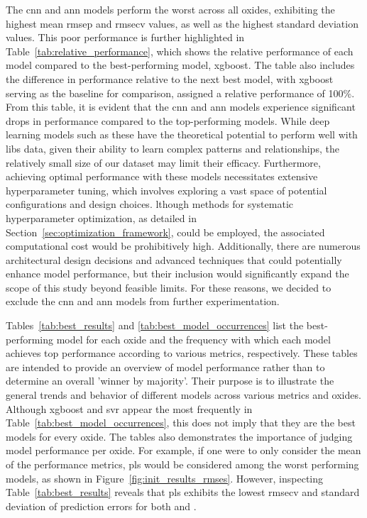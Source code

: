 The \gls{cnn} and \gls{ann} models perform the worst across all oxides, exhibiting the highest mean \gls{rmsep} and \gls{rmsecv} values, as well as the highest standard deviation values.
This poor performance is further highlighted in Table~\ref{tab:relative_performance}, which shows the relative performance of each model compared to the best-performing model, \gls{xgboost}.
The table also includes the difference in performance relative to the next best model, with \gls{xgboost} serving as the baseline for comparison, assigned a relative performance of 100\%.
From this table, it is evident that the \gls{cnn} and \gls{ann} models experience significant drops in performance compared to the top-performing models.
While deep learning models such as these have the theoretical potential to perform well with \gls{libs} data, given their ability to learn complex patterns and relationships, the relatively small size of our dataset may limit their efficacy.
Furthermore, achieving optimal performance with these models necessitates extensive hyperparameter tuning, which involves exploring a vast space of potential configurations and design choices.
lthough methods for systematic hyperparameter optimization, as detailed in Section~\ref{sec:optimization_framework}, could be employed, the associated computational cost would be prohibitively high.
Additionally, there are numerous architectural design decisions and advanced techniques that could potentially enhance model performance, but their inclusion would significantly expand the scope of this study beyond feasible limits.
For these reasons, we decided to exclude the \gls{cnn} and \gls{ann} models from further experimentation.

Tables~\ref{tab:best_results} and \ref{tab:best_model_occurrences} list the best-performing model for each oxide and the frequency with which each model achieves top performance according to various metrics, respectively.
These tables are intended to provide an overview of model performance rather than to determine an overall 'winner by majority'.
Their purpose is to illustrate the general trends and behavior of different models across various metrics and oxides.
Although \gls{xgboost} and \gls{svr} appear the most frequently in Table~\ref{tab:best_model_occurrences}, this does not imply that they are the best models for every oxide.
The tables also demonstrates the importance of judging model performance per oxide.
For example, if one were to only consider the mean of the performance metrics, \gls{pls} would be considered among the worst performing models, as shown in Figure~\ref{fig:init_results_rmses}.
However, inspecting Table~\ref{tab:best_results} reveals that \gls{pls} exhibits the lowest \gls{rmsecv} and standard deviation of prediction errors for both  and .

